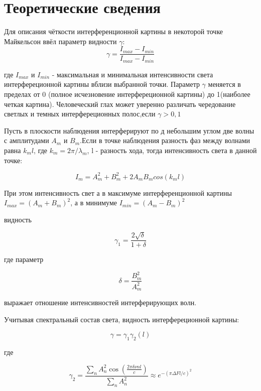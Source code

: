 \documentclass[a4paper,12pt]{article}
\begin{document}
\section*{Теоретические сведения}

Для описания чёткости интерференционной
картины в некоторой
точке Майкельсон ввёл параметр видности $\gamma$:
\begin{equation}
\gamma = \frac{I_{max}-I_{min}}{I_{max}-I_{min}}
\end{equation}

где $I_{max}$ и  $I_{min}$ - максимальная и минимальная интенсивности света интерфереционной картины вблизи выбранной точки. Параметр $\gamma$ меняется в пределах от 0 (полное исчезновение интерфереционной картины) до 1(наиболее четкая картина). Человеческий глах может уверенно различать чередование светлых и темных интерфереционных полос,если $\gamma > 0,1$

Пусть в плоскости наблюдения интерферируют по
д небольшим углом две волны с амплитудами $A_m$ и $B_m$.Если в точке наблюдения разность фаз между волнами равна $k_m l$, где $k_m =2 \pi / \lambda_m$, l - разность хода, тогда интенсивность света в данной точке:

\begin{equation}
I_m = A_m^2 + B_m^2 + 2 A_m B_m cos(k_m l)
\end{equation}

При этом интенсивность свет
а в максимуме интерференционной
картины $I_{max} = (A_m + B_m)^2$, а в минимуме $I_{min} = (A_m - B_m)^2$

видность 

\begin{equation} \label{eq:gamma_1}
\gamma_1 = \frac{2 \sqrt{\delta}}{1 + \delta}
\end{equation}

где параметр 

\begin{equation}
\delta = \frac{B_m^2}{A_m^2}
\end{equation}

выражает отношение интенсивностей интерферирующих волн.

Учитывая спектральный состав света, видность интерфереционной картины:

\begin{equation}
\gamma = \gamma_1 \gamma_2(l)
\end{equation}

где 

\begin{equation}
\gamma_2 = \frac{\sum\limits_{n}A_n^2 \cos \left(\frac{2 \pi \delta \nu n l}{c}\right)}{\sum\limits_{n}A_n^2} \approx e^{-(\pi \Delta F l/c)^2}
\end{equation}
\end{document}
